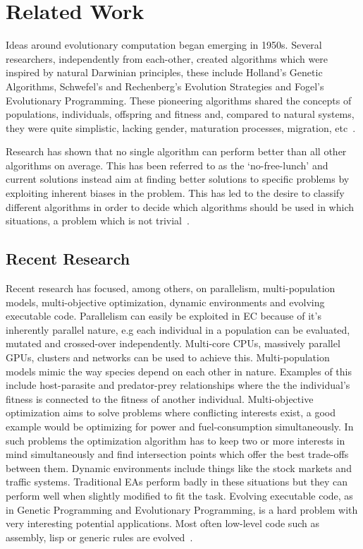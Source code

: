 \section{Related Work}

Ideas around evolutionary computation began emerging in 1950s. Several researchers, independently from each-other, created algorithms which were inspired by natural Darwinian principles, these include Holland's Genetic Algorithms, Schwefel's and Rechenberg's Evolution Strategies and Fogel's Evolutionary Programming. These pioneering algorithms shared the concepts of populations, individuals, offspring and fitness and, compared to natural systems, they were quite simplistic, lacking gender, maturation processes, migration, etc~\cite{dejong2009EC}.

Research has shown that no single algorithm can perform better than all other algorithms on average. This has been referred to as the `no-free-lunch' and current solutions instead aim at finding better solutions to specific problems by exploiting inherent biases in the problem. This has led to the desire to classify different algorithms in order to decide which algorithms should be used in which situations, a problem which is not trivial~\cite{dejong2009EC}.

\subsection{Recent Research}

Recent research has focused, among others, on parallelism, multi-population models, multi-objective optimization, dynamic environments and evolving executable code. Parallelism can easily be exploited in EC because of it's inherently parallel nature, e.g each individual in a population can be evaluated, mutated and crossed-over independently. Multi-core CPUs, massively parallel GPUs, clusters and networks can be used to achieve this. Multi-population models mimic the way species depend on each other in nature. Examples of this include host-parasite and predator-prey relationships where the the individual's fitness is connected to the fitness of another individual. Multi-objective optimization aims to solve problems where conflicting interests exist, a good example would be optimizing for power and fuel-consumption simultaneously. In such problems the optimization algorithm has to keep two or more interests in mind simultaneously and find intersection points which offer the best trade-offs between them. Dynamic environments include things like the stock markets and traffic systems. Traditional EAs perform badly in these situations but they can perform well when slightly modified to fit the task. Evolving executable code, as in Genetic Programming and Evolutionary Programming, is a hard problem with very interesting potential applications. Most often low-level code such as assembly, lisp or generic rules are evolved~\cite{dejong2009EC}.

